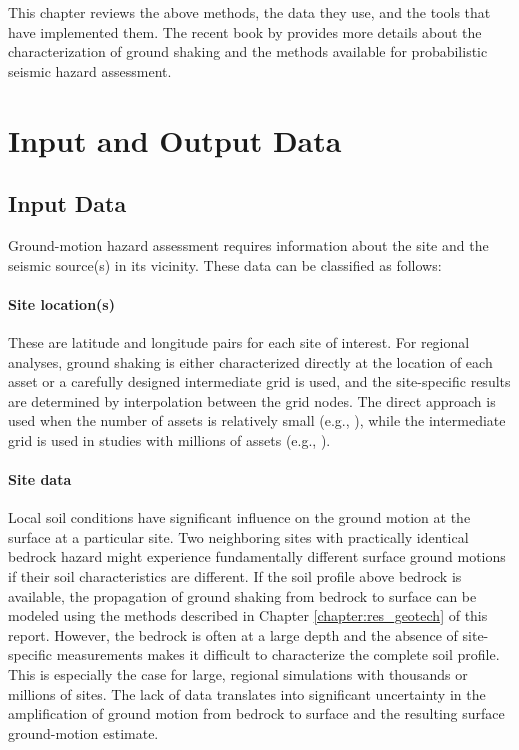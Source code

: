 This chapter reviews the above methods, the data they use, and the tools that have implemented them. The recent book by \citet{baker2021seismic} provides more details about the characterization of ground shaking and the methods available for probabilistic seismic hazard assessment. 

\section{Input and Output Data}
\label{sec:eq_shake_io}

\subsection{Input Data}

Ground-motion hazard assessment requires information about the site and the seismic source(s) in its vicinity. These data can be classified as follows:

\paragraph{Site location(s)} These are latitude and longitude pairs for each site of interest. For regional analyses, ground shaking is either characterized directly at the location of each asset or a carefully designed intermediate grid is used, and the site-specific results are determined by interpolation between the grid nodes. The direct approach is used when the number of assets is relatively small (e.g., \cite{padgett2010regional}), while the intermediate grid is used in studies with millions of assets (e.g., \cite{deierlein2020cloud}).


\paragraph{Site data} Local soil conditions have significant influence on the ground motion at the surface at a particular site. Two neighboring sites with practically identical bedrock hazard might experience fundamentally different surface ground motions if their soil characteristics are different. If the soil profile above bedrock is available, the propagation of ground shaking from bedrock to surface can be modeled using the methods described in Chapter \ref{chapter:res_geotech} of this report. However, the bedrock is often at a large depth and the absence of site-specific measurements makes it difficult to characterize the complete soil profile. This is especially the case for large, regional simulations with thousands or millions of sites. The lack of data translates into significant uncertainty in the amplification of ground motion from bedrock to surface and the resulting surface ground-motion estimate. 


